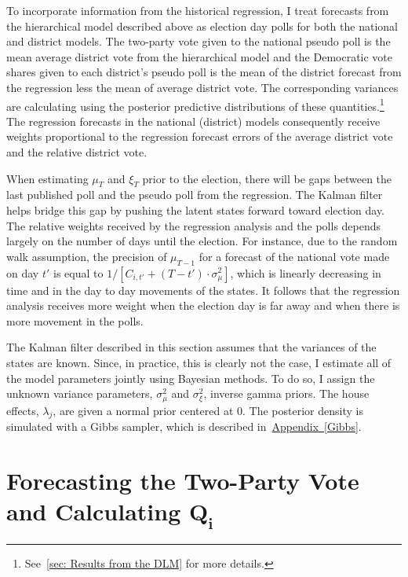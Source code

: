 \documentclass[12pt,final,fleqn]{article}
\newcommand{\aref}[1]{\hyperref[#1]{Appendix~\ref{#1}}}
\theoremstyle{plain}
\begin{document}
To incorporate information from the historical regression, I treat forecasts from the hierarchical model described above as election day polls for both the national and district models. The two-party vote given to the national pseudo poll is the mean average district vote from the hierarchical model and the Democratic vote shares given to each district's pseudo poll is the mean of the district forecast from the regression less the mean of average district vote. The corresponding variances are calculating using the posterior predictive distributions of these quantities.\footnote{See~\autoref{sec: Results from the DLM} for more details.} The regression forecasts in the national (district) models consequently receive weights proportional to the regression forecast errors of the average district vote and the relative district vote. 

When estimating $\mu_T$ and $\xi_T$ prior to the election, there will be gaps between the last published poll and the pseudo poll from the regression. The Kalman filter helps bridge this gap by pushing the latent states forward toward election day. The relative weights received by the regression analysis and the polls depends largely on the number of days until the election. For instance, due to the random walk assumption, the precision of $\mu_{T-1}$ for a forecast of the national vote made on day $t'$ is equal to $1/\left[C_{i,t'} + (T-t')\cdot \sigma^2_\mu\right]$, which is linearly decreasing in time and in the day to day movements of the states. It follows that the regression analysis receives more weight when the election day is far away and when there is more movement in the polls.  

The Kalman filter described in this section assumes that the variances of the states are known. Since, in practice, this is clearly not the case, I estimate all of the model parameters jointly using Bayesian methods. To do so, I assign the unknown variance parameters, $\sigma_\mu^2$ and $\sigma_\xi^2$, inverse gamma priors. The house effects, $\lambda_j$, are given a normal prior centered at $0$. The posterior density is simulated with a Gibbs sampler, which is described in~\aref{Gibbs}.

\section{Forecasting the Two-Party Vote and Calculating $\mathbf{Q_i}$}
\end{document}
